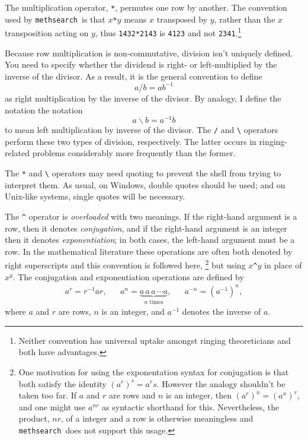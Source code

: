 \documentclass[a4paper,11pt,oneside]{book}
\def\textitidx#1{\textit{#1}\index{#1}}
\def\methsearch{\texttt{meth\-search}}
\begin{document}
The multiplication operator, \verb+*+, 
permutes one row by another.  The convention used by 
\methsearch\ is that $x$\verb+*+$y$ means $x$ transposed by $y$, rather
than the $x$ transposition acting on $y$, thus \verb+1432*2143+ is 
\verb+4123+ and not \verb+2341+.\footnote{Neither convention has universal 
uptake amongst ringing theoreticians and both have advantages.}

Because row multiplication is non-commutative, 
division isn't uniquely defined.  
You need to specify whether the dividend is right- or
left-multiplied by the inverse of the divisor.  As a result, it is the
general convention to define
\[ a/b = a b^{-1} \]
as right multiplication by the inverse of the divisor.  By analogy, I 
define the notation the notation
\[  a\backslash b = a^{-1} b \]
to mean left multiplication by inverse of the divisor.  The \verb+/+ and
\verb+\+ operators perform these two types of division, respectively.
The latter occurs in ringing-related problems considerably more frequently 
than the former.

The \verb+*+ and \verb+\+ operators may need quoting
to prevent the shell from trying to interpret them.  As usual, on Windows, 
double quotes should be used; and on Unix-like systems, single quotes will 
be necessary.

The \verb+^+ operator is \textit{overloaded} 
with two meanings.  If the right-hand argument is a row, 
then it denotes \textitidx{conjugation}, and if the right-hand
argument is an integer then it denotes \textitidx{exponentiation};
in both cases, the left-hand argument must be a row.  In the mathematical
literature these operations are often both denoted by right superscripts
and this convention is followed here,%
\footnote{One motivation for using the exponentation syntax for conjugation
is that both satisfy the identity $(a^r)^s =  a^rs$.  However the analogy 
shouldn't be taken too far.  If $a$ and $r$ are rows and $n$ is an integer,
then $(a^r)^n = (a^n)^r$, and one might use $a^{nr}$ as syntactic shorthand 
for this.  Nevertheless, the product, $nr$, of a integer and a row is 
otherwise meaningless and \methsearch\ does not support this usage.}
but using $x$\verb+^+$y$ in place of $x^y$.
The conjugation and exponentiation operations are defined by
\begin{align*}
a^r = r^{-1} a r, && 
a^n = \underbrace{a\,a\,a\,\dotsm a}_{\text{$n$ times}}, &&
a^{-n} = (a^{-1})^n,
\end{align*}
where $a$ and $r$ are rows, $n$ is an integer, and
$a^{-1}$ denotes the inverse of $a$.
\end{document}
